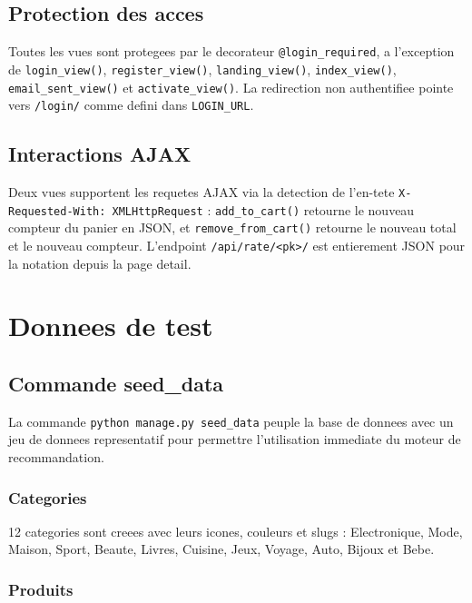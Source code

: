 \documentclass[12pt,a4paper]{report}
\newcommand{\fonction}[1]{\texttt{#1()}}
\newcommand{\var}[1]{\texttt{#1}}
\begin{document}
\section{Protection des acces}

Toutes les vues sont protegees par le decorateur \texttt{@login\_required},
a l'exception de \fonction{login\_view}, \fonction{register\_view},
\fonction{landing\_view}, \fonction{index\_view}, \fonction{email\_sent\_view}
et \fonction{activate\_view}. La redirection non authentifiee pointe vers
\texttt{/login/} comme defini dans \var{LOGIN\_URL}.

\section{Interactions AJAX}

Deux vues supportent les requetes AJAX via la detection de l'en-tete
\texttt{X-Requested-With: XMLHttpRequest} : \fonction{add\_to\_cart} retourne
le nouveau compteur du panier en JSON, et \fonction{remove\_from\_cart} retourne
le nouveau total et le nouveau compteur. L'endpoint \texttt{/api/rate/<pk>/}
est entierement JSON pour la notation depuis la page detail.

\chapter{Donnees de test}

\section{Commande seed\_data}

La commande \texttt{python manage.py seed\_data} peuple la base de donnees
avec un jeu de donnees representatif pour permettre l'utilisation immediate du
moteur de recommandation.

\subsection{Categories}

12 categories sont creees avec leurs icones, couleurs et slugs :
Electronique, Mode, Maison, Sport, Beaute, Livres, Cuisine, Jeux,
Voyage, Auto, Bijoux et Bebe.

\subsection{Produits}
\end{document}
